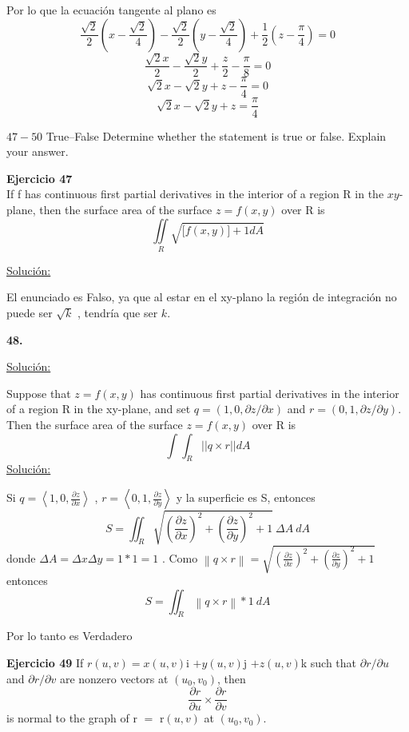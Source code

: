 \documentclass{report}
\newcommand{\s}{\underline{Soluci\'{o}n:}}
\begin{document}
	Por lo que la ecuaci\'{o}n tangente al plano es
	\[\frac{\sqrt{2}}{2}\left(x -\frac{\sqrt{2}}{4} \right)  - \frac{\sqrt{2}}{2}\left(y -\frac{\sqrt{2}}{4} \right) +  \frac{1}{2}\left(z -\frac{\pi}{4} \right) = 0 \]
	\[\frac{\sqrt{2}x}{2} - \frac{\sqrt{2}y}{2} + \frac{z}{2}- \frac{\pi}{8} = 0\]
	\[\sqrt{2}x - \sqrt{2}y + z - \frac{\pi}{4} = 0 \]
	\[\sqrt{2}x - \sqrt{2}y + z = \frac{\pi}{4}  \]
	
	$47-50$ True–False Determine whether the statement is true or
	false. Explain your answer.
	
	\textbf{Ejercicio 47} \\
	If f has continuous first partial derivatives in the interior
	of a region R in the $xy$-plane, then the surface area of the
	surface $z = f(x,y)$ over R is
	\[ \displaystyle \iint \limits_R \sqrt{\Big[f(x,y)\Big] + 1 dA} \]
	
	\s
	
	El enunciado es Falso, ya que al estar en el xy-plano la regi\'{o}n de integraci\'{o}n
	no puede ser $\sqrt{k}$ , tendr\'{i}a que ser $k.$
	
	\textbf{48.} 
	
	\s
	
	Suppose that $z = f(x, y)$ has continuous first partial derivatives
	in the interior of a region R in the xy-plane, and set
	$q = \left( 1, 0, \partial z/\partial x\right)$  and $r = \left( 0, 1, \partial z/ \partial y\right) $. Then the surface
	area of the surface $z = f(x, y)$ over R is
	\[\int\int_R||q\times r|| dA\]
	\s 
	
	Si $q = \left \langle 1,0, \frac{\partial z}{\partial x} \right \rangle  $ , $r = \left \langle 0,1, \frac{\partial z}{\partial y} \right \rangle  $  y la superficie es S, entonces $$S =\iint_{R}\sqrt{\left (  \frac{\partial z}{\partial x} \right )^2 + \left (  \frac{\partial z}{\partial y} \right )^2 + 1}~\Delta A ~dA$$ donde $\Delta A = \Delta x \Delta y = 1 * 1 = 1$ .
	Como $\left \| q\times  r\right \|=\sqrt{\left (  \frac{\partial z}{\partial x} \right )^2 + \left (  \frac{\partial z}{\partial y} \right )^2 + 1}$ entonces $$S=\iint_{R}\left \| q\times  r\right \|*1~dA$$
	
	Por lo tanto es Verdadero 
	
	\textbf{Ejercicio 49} If $r(u, v) = x(u, v)$i $+ y(u, v)$j $+ z(u, v)$k such that $\partial r/\partial u$ and $\partial r/\partial v$ are nonzero vectors at $(u_0, v_0)$, then
	\[\frac{\partial r}{\partial u} \times \frac{\partial r}{\partial v} \]
	is normal to the graph of r $=$ r$(u, v)$ at $(u_0, v_0)$.
	
\end{document}
